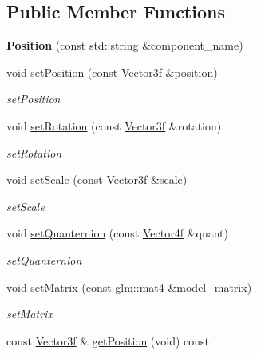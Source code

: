 \subsection*{Public Member Functions}
\begin{DoxyCompactItemize}
\item 
\hypertarget{classEngine_1_1Position_a0272e50c356513dd03d8bcae988bc6c1}{}{\bfseries Position} (const std\+::string \&component\+\_\+name)\label{classEngine_1_1Position_a0272e50c356513dd03d8bcae988bc6c1}

\item 
void \hyperlink{classEngine_1_1Position_af4faa47a68f4fb9c2e98313e3f4244d8}{set\+Position} (const \hyperlink{classVector3}{Vector3f} \&position)
\begin{DoxyCompactList}\small\item\em set\+Position \end{DoxyCompactList}\item 
void \hyperlink{classEngine_1_1Position_a145a53d6a9842f2c9ce9e238eb21884f}{set\+Rotation} (const \hyperlink{classVector3}{Vector3f} \&rotation)
\begin{DoxyCompactList}\small\item\em set\+Rotation \end{DoxyCompactList}\item 
void \hyperlink{classEngine_1_1Position_a2e42fbf00ddfac1b1c1b92baa9e03b87}{set\+Scale} (const \hyperlink{classVector3}{Vector3f} \&scale)
\begin{DoxyCompactList}\small\item\em set\+Scale \end{DoxyCompactList}\item 
void \hyperlink{classEngine_1_1Position_a396150281cfa2604a48b7f90fc858b9c}{set\+Quanternion} (const \hyperlink{classVector4}{Vector4f} \&quant)
\begin{DoxyCompactList}\small\item\em set\+Quanternion \end{DoxyCompactList}\item 
void \hyperlink{classEngine_1_1Position_a1daaa95f7197ef1f2ecbcc29639d3040}{set\+Matrix} (const glm\+::mat4 \&model\+\_\+matrix)
\begin{DoxyCompactList}\small\item\em set\+Matrix \end{DoxyCompactList}\item 
const \hyperlink{classVector3}{Vector3f} \& \hyperlink{classEngine_1_1Position_a91f993c0f10be51167737aad36065188}{get\+Position} (void) const 

\end{DoxyCompactItemize}
